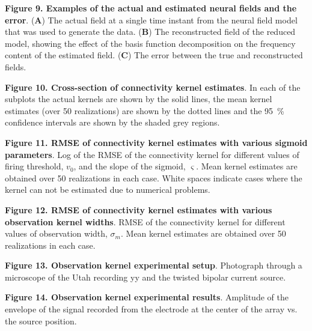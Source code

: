 \documentclass[review,authoryear,3p]{elsarticle}
\begin{document}
{\bf Figure 9. Examples of the actual and estimated neural fields and the error}. (\textbf{A}) The actual field at a single time instant from the neural field model that was used to generate the data. (\textbf{B}) The reconstructed field of the reduced model, showing the effect of the basis function decomposition on the frequency content of the estimated field. (\textbf{C}) The error between the true and reconstructed fields.

{\bf Figure 10. Cross-section of connectivity kernel estimates}. In each of the subplots the actual kernels are shown by the solid lines, the mean kernel estimates (over 50 realizations) are shown by the dotted lines and the 95~\% confidence intervals are shown by the shaded grey regions.

{\bf Figure 11. RMSE of connectivity kernel estimates with various sigmoid parameters}. Log of the RMSE of the connectivity kernel for different values of firing threshold, $v_0$, and the slope of the sigmoid, $\varsigma$. Mean kernel estimates are obtained over 50 realizations in each case. White spaces indicate cases where the kernel can not be estimated due to numerical problems.

{\bf Figure 12. RMSE of connectivity kernel estimates with various observation kernel widths}. RMSE of the connectivity kernel for different values of observation width, $\sigma_m$. Mean kernel estimates are obtained over 50 realizations in each case.

{\bf Figure 13. Observation kernel experimental setup}. Photograph through a microscope of the Utah recording yy and the twisted bipolar current source.

{\bf Figure 14. Observation kernel experimental results}. Amplitude of the envelope of the signal recorded from the electrode at the center of the array vs. the source position.
\end{document}
